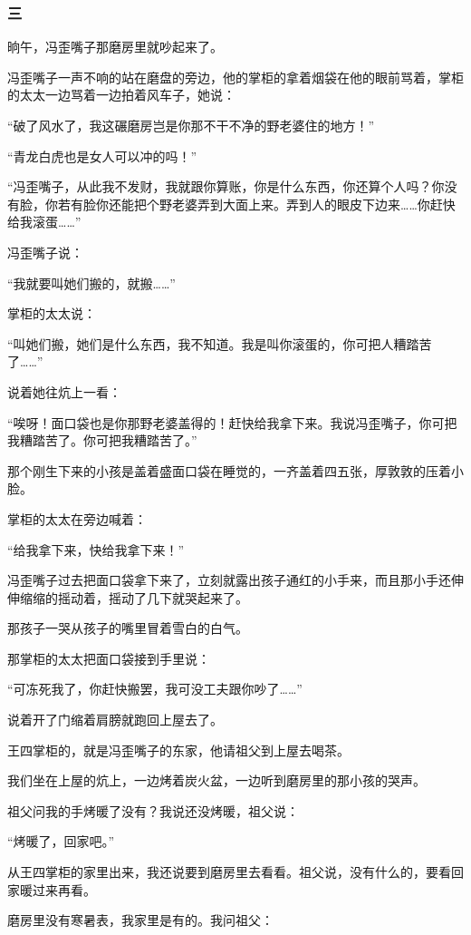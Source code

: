 \subsubsection*{三}
\par 晌午，冯歪嘴子那磨房里就吵起来了。
\par 冯歪嘴子一声不响的站在磨盘的旁边，他的掌柜的拿着烟袋在他的眼前骂着，掌柜的太太一边骂着一边拍着风车子，她说：
\par “破了风水了，我这碾磨房岂是你那不干不净的野老婆住的地方！”
\par “青龙白虎也是女人可以冲的吗！”
\par “冯歪嘴子，从此我不发财，我就跟你算账，你是什么东西，你还算个人吗？你没有脸，你若有脸你还能把个野老婆弄到大面上来。弄到人的眼皮下边来……你赶快给我滚蛋……”
\par 冯歪嘴子说：
\par “我就要叫她们搬的，就搬……”
\par 掌柜的太太说：
\par “叫她们搬，她们是什么东西，我不知道。我是叫你滚蛋的，你可把人糟踏苦了……”
\par 说着她往炕上一看：
\par “唉呀！面口袋也是你那野老婆盖得的！赶快给我拿下来。我说冯歪嘴子，你可把我糟踏苦了。你可把我糟踏苦了。”
\par 那个刚生下来的小孩是盖着盛面口袋在睡觉的，一齐盖着四五张，厚敦敦的压着小脸。
\par 掌柜的太太在旁边喊着：
\par “给我拿下来，快给我拿下来！”
\par 冯歪嘴子过去把面口袋拿下来了，立刻就露出孩子通红的小手来，而且那小手还伸伸缩缩的摇动着，摇动了几下就哭起来了。
\par 那孩子一哭从孩子的嘴里冒着雪白的白气。
\par 那掌柜的太太把面口袋接到手里说：
\par “可冻死我了，你赶快搬罢，我可没工夫跟你吵了……”
\par 说着开了门缩着肩膀就跑回上屋去了。
\par 王四掌柜的，就是冯歪嘴子的东家，他请祖父到上屋去喝茶。
\par 我们坐在上屋的炕上，一边烤着炭火盆，一边听到磨房里的那小孩的哭声。
\par 祖父问我的手烤暖了没有？我说还没烤暖，祖父说：
\par “烤暖了，回家吧。”
\par 从王四掌柜的家里出来，我还说要到磨房里去看看。祖父说，没有什么的，要看回家暖过来再看。
\par 磨房里没有寒暑表，我家里是有的。我问祖父：
